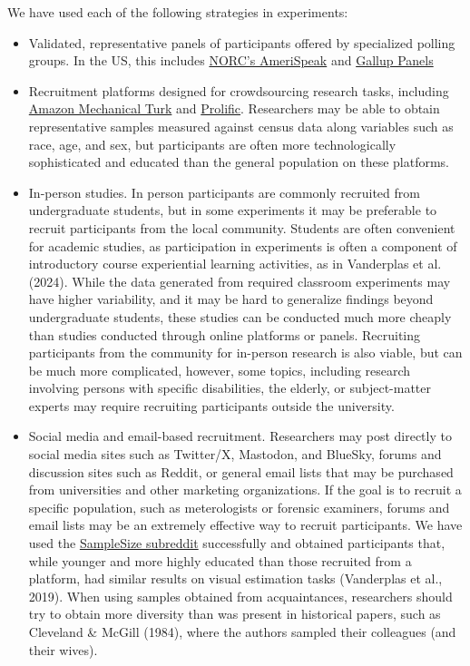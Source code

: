 \documentclass[
  10pt,
  letterpaper,
  DIV=11,
  numbers=noendperiod]{scrartcl}
\begin{document}
We have used each of the following strategies in experiments:

\begin{itemize}
\item
  Validated, representative panels of participants offered by
  specialized polling groups. In the US, this includes
  \href{https://amerispeak.norc.org/us/en/amerispeak/about-amerispeak/panel-design.html}{NORC's
  AmeriSpeak} and
  \href{https://www.gallup.com/analytics/318911/us-social-research.aspx}{Gallup
  Panels}
\item
  Recruitment platforms designed for crowdsourcing research tasks,
  including \href{https://www.mturk.com/}{Amazon Mechanical Turk} and
  \href{https://www.prolific.com/}{Prolific}. Researchers may be able to
  obtain representative samples measured against census data along
  variables such as race, age, and sex, but participants are often more
  technologically sophisticated and educated than the general population
  on these platforms.
\item
  In-person studies. In person participants are commonly recruited from
  undergraduate students, but in some experiments it may be preferable
  to recruit participants from the local community. Students are often
  convenient for academic studies, as participation in experiments is
  often a component of introductory course experiential learning
  activities, as in Vanderplas et al. (2024). While the data generated
  from required classroom experiments may have higher variability, and
  it may be hard to generalize findings beyond undergraduate students,
  these studies can be conducted much more cheaply than studies
  conducted through online platforms or panels. Recruiting participants
  from the community for in-person research is also viable, but can be
  much more complicated, however, some topics, including research
  involving persons with specific disabilities, the elderly, or
  subject-matter experts may require recruiting participants outside the
  university.
\item
  Social media and email-based recruitment. Researchers may post
  directly to social media sites such as Twitter/X, Mastodon, and
  BlueSky, forums and discussion sites such as Reddit, or general email
  lists that may be purchased from universities and other marketing
  organizations. If the goal is to recruit a specific population, such
  as meterologists or forensic examiners, forums and email lists may be
  an extremely effective way to recruit participants. We have used the
  \href{https://web.archive.org/web/20250228110244/https://www.reddit.com/r/SampleSize/}{SampleSize
  subreddit} successfully and obtained participants that, while younger
  and more highly educated than those recruited from a platform, had
  similar results on visual estimation tasks (Vanderplas et al., 2019).
  When using samples obtained from acquaintances, researchers should try
  to obtain more diversity than was present in historical papers, such
  as Cleveland \& McGill (1984), where the authors sampled their
  colleagues (and their wives).
\end{itemize}
\end{document}
